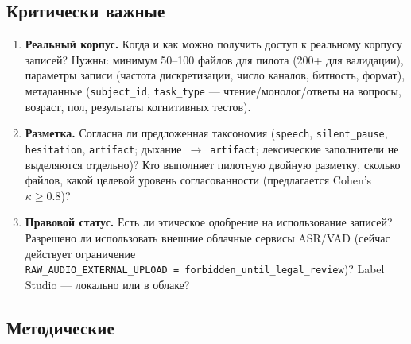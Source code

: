 \documentclass[12pt,a4paper]{article}
\begin{document}
\subsection{Критически важные}

\begin{enumerate}
  \item \textbf{Реальный корпус.} Когда и как можно получить доступ к
   реальному корпусу записей? Нужны: минимум 50--100 файлов для пилота
   (200+ для валидации), параметры записи (частота дискретизации, число
   каналов, битность, формат), метаданные (\texttt{subject\_id},
   \texttt{task\_type} — чтение/монолог/ответы на вопросы, возраст, пол,
   результаты когнитивных тестов).
  \item \textbf{Разметка.} Согласна ли предложенная таксономия
   (\texttt{speech}, \texttt{silent\_pause}, \texttt{hesitation},
   \texttt{artifact}; дыхание~$\to$~\texttt{artifact}; лексические
   заполнители не выделяются отдельно)? Кто выполняет пилотную двойную
   разметку, сколько файлов, какой целевой уровень согласованности
   (предлагается Cohen's $\kappa \geq 0.8$)?
  \item \textbf{Правовой статус.} Есть ли этическое одобрение на
   использование записей? Разрешено ли использовать внешние облачные
   сервисы ASR/VAD (сейчас действует ограничение
   \texttt{RAW\_AUDIO\_EXTERNAL\_UPLOAD~=~forbidden\_until\_legal\_review})?
   Label Studio — локально или в облаке?
\end{enumerate}

\subsection{Методические}
\end{document}
